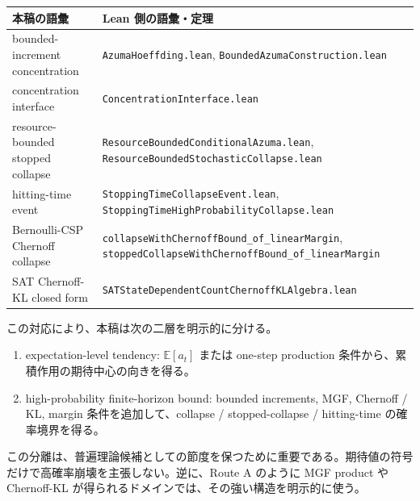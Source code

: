 \documentclass[12pt,a4paper]{article}
\begin{document}
{\def\LTcaptype{table} %
\begin{longtable}[]{@{}
  >{\raggedright\arraybackslash}p{}
  >{\raggedright\arraybackslash}p{}@{}}
\toprule\noalign{}
\begin{minipage}[b]{\linewidth}\raggedright
本稿の語彙
\end{minipage} & \begin{minipage}[b]{\linewidth}\raggedright
Lean 側の語彙・定理
\end{minipage} \\
\midrule\noalign{}
\endhead
\bottomrule\noalign{}
\endlastfoot
bounded-increment concentration & \texttt{AzumaHoeffding.lean}, \texttt{BoundedAzumaConstruction.lean} \\
concentration interface & \texttt{ConcentrationInterface.lean} \\
resource-bounded stopped collapse & \texttt{ResourceBoundedConditionalAzuma.lean}, \texttt{ResourceBoundedStochasticCollapse.lean} \\
hitting-time event & \texttt{StoppingTimeCollapseEvent.lean}, \texttt{StoppingTimeHighProbabilityCollapse.lean} \\
Bernoulli-CSP Chernoff collapse & \texttt{collapseWithChernoffBound\_of\_linearMargin}, \texttt{stoppedCollapseWithChernoffBound\_of\_linearMargin} \\
SAT Chernoff-KL closed form & \texttt{SATStateDependentCountChernoffKLAlgebra.lean} \\
\end{longtable}
}

この対応により、本稿は次の二層を明示的に分ける。

\begin{enumerate}
\def\labelenumi{\arabic{enumi}.}
\tightlist
\item
  expectation-level tendency: \(\mathbb E[a_{t}]\) または one-step production 条件から、累積作用の期待中心の向きを得る。
\item
  high-probability finite-horizon bound: bounded increments, MGF, Chernoff / KL, margin 条件を追加して、collapse / stopped-collapse / hitting-time の確率境界を得る。
\end{enumerate}

この分離は、普遍理論候補としての節度を保つために重要である。期待値の符号だけで高確率崩壊を主張しない。逆に、Route A のように MGF product や Chernoff-KL が得られるドメインでは、その強い構造を明示的に使う。
\end{document}
